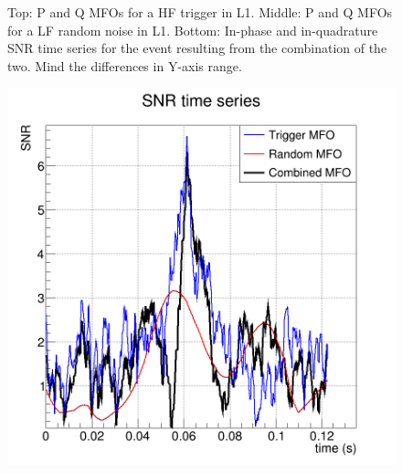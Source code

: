 \begin{figure}[ht]
\begin{minipage}{\linewidth}
    \end{minipage}
    \hfill
    \caption{Top: P and Q MFOs for a HF trigger in L1. Middle: P and Q MFOs for a LF random noise in L1. Bottom: In-phase and in-quadrature SNR time series for the event resulting from the combination of the two. Mind the differences in Y-axis range.}
    \label{fig:mfo_PQ}
\end{figure}

\begin{figure}
  \centering
  \includegraphics[width=0.5\linewidth]{sectionFAR/O4/cSnrMFO.png}
  \label{fig:mfoCombi}
\end{figure}





